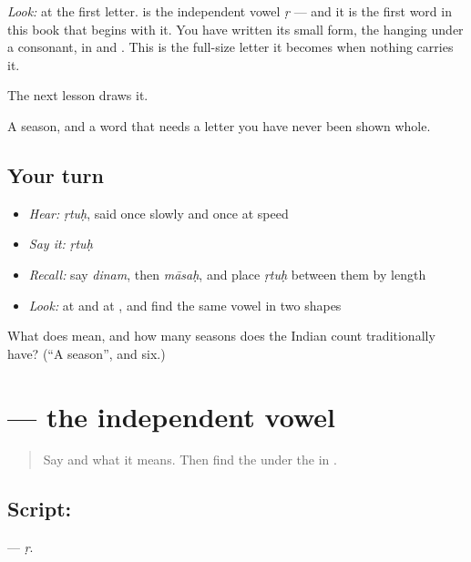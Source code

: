 \emph{Look:} at the first letter. \textbf{} is the independent vowel \emph{ṛ} — and it is the first word in this book that begins with it. You have written its small form, the \textbf{} hanging under a consonant, in \textbf{} and \textbf{}. This is the full-size letter it becomes when nothing carries it.

The next lesson draws it.

\begin{grammarlens}[title={What you've built}]
A season, and a word that needs a letter you have never been shown whole.
\end{grammarlens}

\subsection*{Your turn}
\begin{itemize}
\raggedright
  \item \emph{Hear:} \emph{ṛtuḥ}, said once slowly and once at speed
  \item \emph{Say it:} \emph{ṛtuḥ}
  \item \emph{Recall:} say \emph{dinam}, then \emph{māsaḥ}, and place \emph{ṛtuḥ} between them by length
  \item \emph{Look:} at \textbf{} and at \textbf{}, and find the same vowel in two shapes
\end{itemize}

\begin{tcolorbox}[breakable,colback=teal!4,colframe=teal!35!black,title={Before you move on}]
What does \textbf{} mean, and how many seasons does the Indian count traditionally have? (\textquotedblleft{}A season\textquotedblright{}, and six.)
\end{tcolorbox}
\section[\texorpdfstring{\sk{ऋ} (ṛ)}{ऋ (ṛ)}]{ — the independent vowel}

\label{lesson:SA-S225-letter-vocalic-r}



\begin{quote}
Say \textbf{} and what it means. Then find the \textbf{} under the \textbf{} in \textbf{}.
\end{quote}

\subsection*{Script: }
\textbf{} — \emph{ṛ}.

